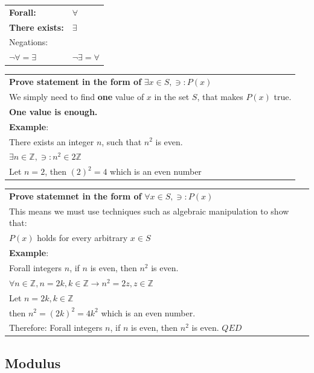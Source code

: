 \documentclass{article}
\begin{document}
\begin{center}
\begin{tabular}{ll}
\textbf{Forall:}& $\forall$\\
\textbf{There exists:}& $\exists$\\
\hline
Negations:\\
$\neg\forall = \exists$ & $\neg\exists = \forall$
\end{tabular}
\vline
\begin{tabular}{l}
\textbf{Prove statement in the form of} $\exists x \in S, \ni: P(x)$\\
We simply need to find \textbf{one} value of $x$ in the set $S$, that makes $P(x)$ true.\\
\textbf{One value is enough.}\\
\hline
\textbf{Example}:\\
There exists an integer $n$, such that $n^2$ is even.\\
$\exists n \in \mathbb Z, \ni: n^2 \in 2 \mathbb Z$\\
Let $n = 2$, then $(2)^2 = 4$ which is an even number
\end{tabular}

\vspace{0.5cm}

\begin{tabular}{l}
\textbf{Prove statemnet in the form of} $\forall x \in S, \ni: P(x)$\\
This means we must use techniques such as algebraic manipulation to show that:\\
$P(x)$ holds for every arbitrary $x \in S$\\
\hline
\textbf{Example}:\\
Forall integers $n$, if $n$ is even, then $n^2$ is even.\\
$\forall n \in \mathbb Z, n = 2k, k \in \mathbb Z \rightarrow n^2 = 2z, z \in \mathbb Z$\\
Let $n = 2k, k \in \mathbb Z$\\
then $n^2 = (2k)^2 = 4k^2$ which is an even number.\\
Therefore: Forall integers $n$, if $n$ is even, then $n^2$ is even. $QED$
\end{tabular}

\end{center}

\hrulefill

\subsection{Modulus}
\end{document}
